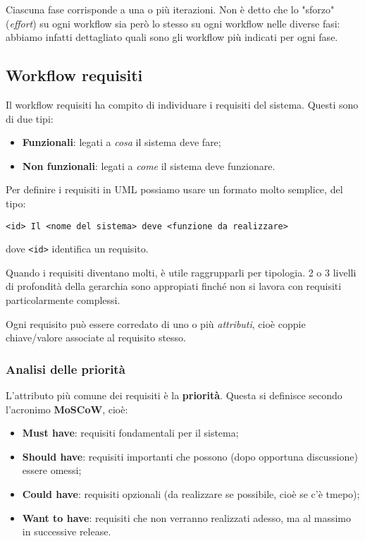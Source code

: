 \documentclass[a4paper,11pt]{article}
\begin{document}
Ciascuna fase corrisponde a una o più iterazioni. Non è detto che lo "sforzo" (\textit{effort}) su ogni workflow sia però lo stesso su ogni workflow nelle diverse fasi: abbiamo infatti dettagliato quali sono gli workflow più indicati per ogni fase.

\subsection{Workflow requisiti}
Il workflow requisiti ha compito di individuare i requisiti del sistema.
Questi sono di due tipi:
\begin{itemize}
	\item \textbf{Funzionali}: legati a \textit{cosa} il sistema deve fare;
	\item \textbf{Non funzionali}: legati a \textit{come} il sistema deve funzionare.
\end{itemize}

Per definire i requisiti in UML possiamo usare un formato molto semplice, del tipo:
\begin{lstlisting}[style=codestyle]	
<id> Il <nome del sistema> deve <funzione da realizzare>
\end{lstlisting}
dove \lstinline|<id>| identifica un requisito.

Quando i requisiti diventano molti, è utile raggrupparli per tipologia. 2 o 3 livelli di profondità della gerarchia sono appropiati finché non si lavora con requisiti particolarmente complessi.

Ogni requisito può essere corredato di uno o più \textit{attributi}, cioè coppie chiave/valore associate al requisito stesso.

\subsubsection{Analisi delle priorità}
L'attributo più comune dei requisiti è la \textbf{priorità}. Questa si definisce secondo l'acronimo \textbf{MoSCoW}, cioè:
\begin{itemize}
	\item \textbf{Must have}: requisiti fondamentali per il sistema;
	\item \textbf{Should have}: requisiti importanti che possono (dopo opportuna discussione) essere omessi;
	\item \textbf{Could have}: requisiti opzionali (da realizzare se possibile, cioè se c'è tmepo);
	\item \textbf{Want to have}: requisiti che non verranno realizzati adesso, ma al massimo in successive release.
\end{itemize}
\end{document}
